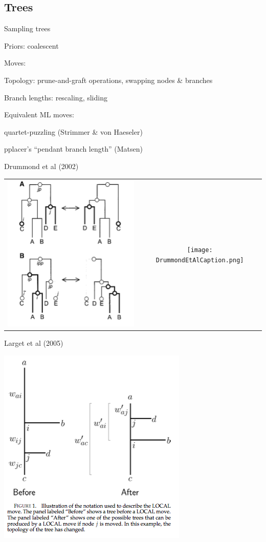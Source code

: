 \documentclass{beamer}
\begin{document}
\subsection{Trees}

\begin{frame}{Sampling trees}

\itemb
\item Priors: coalescent
\item Moves:
\itemb
\item Topology: prune-and-graft operations, swapping nodes \& branches
\item Branch lengths: rescaling, sliding
\iteme
\item Equivalent ML moves:
\itemb
\item quartet-puzzling (Strimmer \& von Haeseler)
\item pplacer's ``pendant branch length'' (Matsen)
\iteme
\iteme

\end{frame}


\begin{frame}{Drummond et al (2002)}

\begin{tabular}{cc}
  \includegraphics[width=.4\textwidth]{DrummondEtAlMCMC.png}
&
  \texttt{[image: DrummondEtAlCaption.png]}
\end{tabular}

\end{frame}

\begin{frame}{Larget et al (2005)}

  \includegraphics[width=.6\textwidth]{LargetEtAlMCMC.png}

\end{frame}
\end{document}
